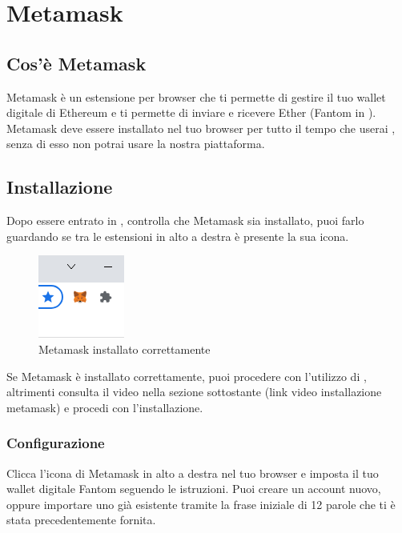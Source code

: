 \section{Metamask}\label{section:metamask}
\subsection{Cos'è Metamask}
Metamask è un estensione per browser che ti permette di gestire il tuo wallet digitale di Ethereum e ti permette di inviare e ricevere Ether (Fantom in \projectName{}).
Metamask deve essere installato nel tuo browser per tutto il tempo che userai \projectName{}, senza di esso non potrai usare la nostra piattaforma.
\subsection{Installazione}
Dopo essere entrato in \projectName{}, controlla che Metamask sia installato, puoi farlo guardando se tra le estensioni in alto a destra è presente la sua icona.

    \begin{figure}[htbp]
        \centering
        \includegraphics{immagini/metamask_installed.png}
        \caption{Metamask installato correttamente}
    \end{figure}   
 Se Metamask è installato correttamente, puoi procedere con l'utilizzo di \projectName, altrimenti consulta il video nella sezione sottostante (link video installazione metamask) e procedi con l'installazione.

\subsubsection{Configurazione}
Clicca l'icona di Metamask in alto a destra nel tuo browser e imposta il tuo wallet digitale Fantom seguendo le istruzioni.
Puoi creare un account nuovo, oppure importare uno già esistente tramite la frase iniziale di 12 parole che ti è stata precedentemente fornita.
